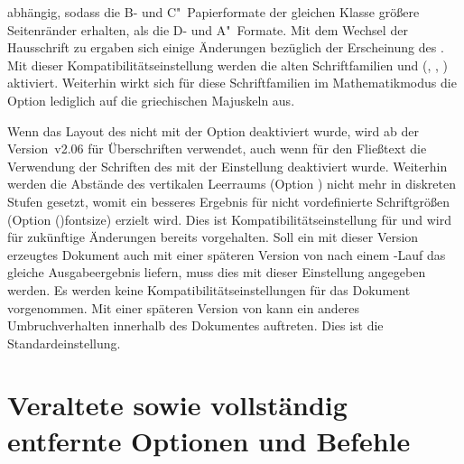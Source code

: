 \begin{Declaration}
\begin{DeclareValues}{}
  abhängig, sodass die B- und C"~Papierformate der gleichen Klasse größere 
  Seitenränder erhalten, als die D- und A"~Formate.
  Mit dem Wechsel der Hausschrift zu \OpenSans ergaben sich einige Änderungen 
  bezüglich der Erscheinung des \CDs. Mit dieser Kompatibilitätseinstellung 
  werden die alten Schriftfamilien \Univers und \DIN 
  (, , )
  aktiviert. Weiterhin wirkt sich für diese Schriftfamilien im Mathematikmodus 
  die Option  lediglich auf die griechischen 
  Majuskeln aus.
  
  Wenn das Layout des \CDs nicht mit der Option  deaktiviert 
  wurde, wird ab der Version~v2.06 für Überschriften \OpenSans verwendet, auch 
  wenn für den Fließtext die Verwendung der Schriften des \CDs mit der 
  Einstellung  deaktiviert wurde. Weiterhin werden die 
  Abstände des vertikalen Leerraums (Option ) nicht 
  mehr in diskreten Stufen gesetzt, womit ein besseres Ergebnis für nicht 
  vordefinierte Schriftgrößen (Option \Option(){fontsize}) 
  erzielt wird.
  Dies ist Kompatibilitätseinstellung für \vTUDScript*{\TUDScript} und wird für 
  zukünftige Änderungen bereits vorgehalten. Soll ein mit dieser Version 
  erzeugtes Dokument auch mit einer späteren Version von \TUDScript nach einem 
  -Lauf das gleiche Ausgabeergebnis liefern, muss dies mit 
  dieser Einstellung angegeben werden.
  Es werden keine Kompatibilitätseinstellungen für das Dokument vorgenommen. 
  Mit einer späteren Version von \TUDScript kann ein anderes Umbruchverhalten 
  innerhalb des Dokumentes auftreten. Dies ist die Standardeinstellung.
\end{DeclareValues}
\end{Declaration}
%
%



\section{%
  Veraltete sowie vollständig entfernte Optionen und Befehle%
  \label{sec:cessations}%
}

